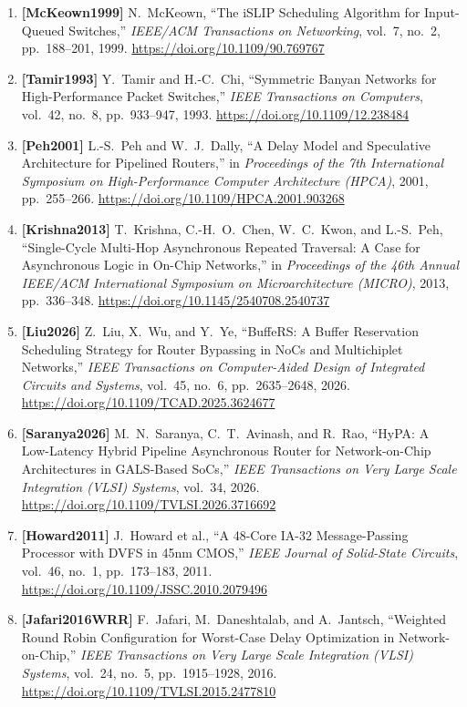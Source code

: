 \begin{enumerate}
    \item \textbf{[McKeown1999]} N.~McKeown, ``The iSLIP Scheduling Algorithm for Input-Queued Switches,'' \emph{IEEE/ACM Transactions on Networking}, vol.~7, no.~2, pp.~188--201, 1999. \url{https://doi.org/10.1109/90.769767}
    \item \textbf{[Tamir1993]} Y.~Tamir and H.-C.~Chi, ``Symmetric Banyan Networks for High-Performance Packet Switches,'' \emph{IEEE Transactions on Computers}, vol.~42, no.~8, pp.~933--947, 1993. \url{https://doi.org/10.1109/12.238484}
    \item \textbf{[Peh2001]} L.-S.~Peh and W.~J.~Dally, ``A Delay Model and Speculative Architecture for Pipelined Routers,'' in \emph{Proceedings of the 7th International Symposium on High-Performance Computer Architecture (HPCA)}, 2001, pp.~255--266. \url{https://doi.org/10.1109/HPCA.2001.903268}
    \item \textbf{[Krishna2013]} T.~Krishna, C.-H.~O.~Chen, W.~C.~Kwon, and L.-S.~Peh, ``Single-Cycle Multi-Hop Asynchronous Repeated Traversal: A Case for Asynchronous Logic in On-Chip Networks,'' in \emph{Proceedings of the 46th Annual IEEE/ACM International Symposium on Microarchitecture (MICRO)}, 2013, pp.~336--348. \url{https://doi.org/10.1145/2540708.2540737}
    \item \textbf{[Liu2026]} Z.~Liu, X.~Wu, and Y.~Ye, ``BuffeRS: A Buffer Reservation Scheduling Strategy for Router Bypassing in NoCs and Multichiplet Networks,'' \emph{IEEE Transactions on Computer-Aided Design of Integrated Circuits and Systems}, vol.~45, no.~6, pp.~2635--2648, 2026. \url{https://doi.org/10.1109/TCAD.2025.3624677}
    \item \textbf{[Saranya2026]} M.~N.~Saranya, C.~T.~Avinash, and R.~Rao, ``HyPA: A Low-Latency Hybrid Pipeline Asynchronous Router for Network-on-Chip Architectures in GALS-Based SoCs,'' \emph{IEEE Transactions on Very Large Scale Integration (VLSI) Systems}, vol.~34, 2026. \url{https://doi.org/10.1109/TVLSI.2026.3716692}
    \item \textbf{[Howard2011]} J.~Howard et al., ``A 48-Core IA-32 Message-Passing Processor with DVFS in 45nm CMOS,'' \emph{IEEE Journal of Solid-State Circuits}, vol.~46, no.~1, pp.~173--183, 2011. \url{https://doi.org/10.1109/JSSC.2010.2079496}
    \item \textbf{[Jafari2016WRR]} F.~Jafari, M.~Daneshtalab, and A.~Jantsch, ``Weighted Round Robin Configuration for Worst-Case Delay Optimization in Network-on-Chip,'' \emph{IEEE Transactions on Very Large Scale Integration (VLSI) Systems}, vol.~24, no.~5, pp.~1915--1928, 2016. \url{https://doi.org/10.1109/TVLSI.2015.2477810}

\end{enumerate}
